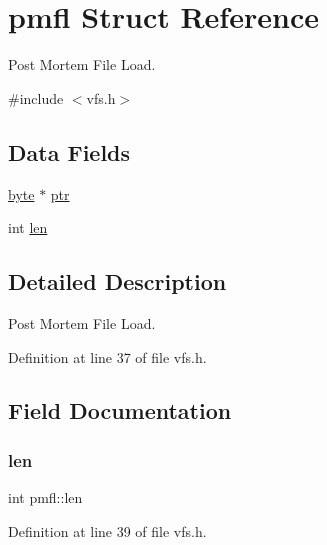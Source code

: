 \hypertarget{a00320}{}\section{pmfl Struct Reference}
\label{a00320}


Post Mortem File Load.  




{\ttfamily \#include $<$vfs.\+h$>$}

\subsection*{Data Fields}
\begin{DoxyCompactItemize}
\item 
\hyperlink{a00140_ab8ef12fab634c171394422d0ee8baf94_ab8ef12fab634c171394422d0ee8baf94}{byte} $\ast$ \hyperlink{a00320_a150c011a31f99dbd408f8650f3fa1089_a150c011a31f99dbd408f8650f3fa1089}{ptr}
\item 
int \hyperlink{a00320_ae4da44b065ddc955692df6fddd24a9c4_ae4da44b065ddc955692df6fddd24a9c4}{len}
\end{DoxyCompactItemize}


\subsection{Detailed Description}
Post Mortem File Load. 

Definition at line 37 of file vfs.\+h.



\subsection{Field Documentation}
\mbox{\label{a00320_ae4da44b065ddc955692df6fddd24a9c4_ae4da44b065ddc955692df6fddd24a9c4}} 
\subsubsection{\texorpdfstring{len}{len}}
{\footnotesize\ttfamily int pmfl\+::len}



Definition at line 39 of file vfs.\+h.

\mbox{\label{a00320_a150c011a31f99dbd408f8650f3fa1089_a150c011a31f99dbd408f8650f3fa1089}} 
